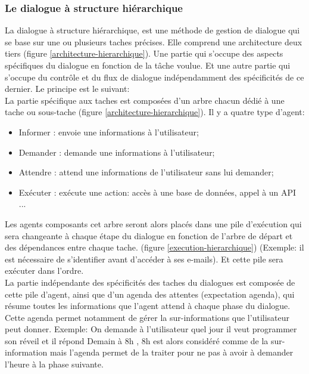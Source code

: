 \subsubsection{Le dialogue à structure hiérarchique}
La dialogue à structure hiérarchique, est une méthode de gestion de dialogue qui se base sur une ou plusieurs taches précises. Elle comprend une architecture deux tiers (figure \ref{architecture-hierarchique}). Une partie qui s'occupe des aspects spécifiques du dialogue en fonction de la tâche voulue. Et une autre partie qui s'occupe du contrôle et du flux de dialogue indépendamment des spécificités de ce dernier. Le principe est le suivant: \\
La partie spécifique aux taches est composées d'un arbre chacun dédié à une tache ou sous-tache (figure \ref{architecture-hierarchique}). Il y a quatre type d'agent:
\begin{itemize}
	\item Informer : envoie une informations à l'utilisateur;
	\item Demander : demande une informations à l'utilisateur;
	\item Attendre : attend une informations de l'utilisateur sans lui demander;
	\item Exécuter : exécute une action: accès à une base de données, appel à un API ...  
\end{itemize} 
Les agents composants cet arbre seront alors placés dans une pile d'exécution qui sera changeante à chaque étape du dialogue en fonction de l'arbre de départ et des dépendances entre chaque tache. (figure \ref{execution-hierarchique}) (Exemple: il est nécessaire de s'identifier avant d'accéder à ses e-mails). Et cette pile sera exécuter dans l'ordre.\\
La partie indépendante des spécificités des taches du dialogues est composée de cette pile d'agent, ainsi que d'un agenda des attentes (expectation agenda), qui résume toutes les informations que l'agent attend à chaque phase du dialogue. Cette agenda permet notamment de gérer la sur-informations que l'utilisateur peut donner. Exemple: On demande à l'utilisateur quel jour il veut programmer son réveil et il répond \og Demain à 8h \fg, 8h est alors considéré comme de la sur-information mais l'agenda permet de la traiter pour ne pas à avoir à demander l'heure à la phase suivante.


\FloatBarrier
 
 
 
